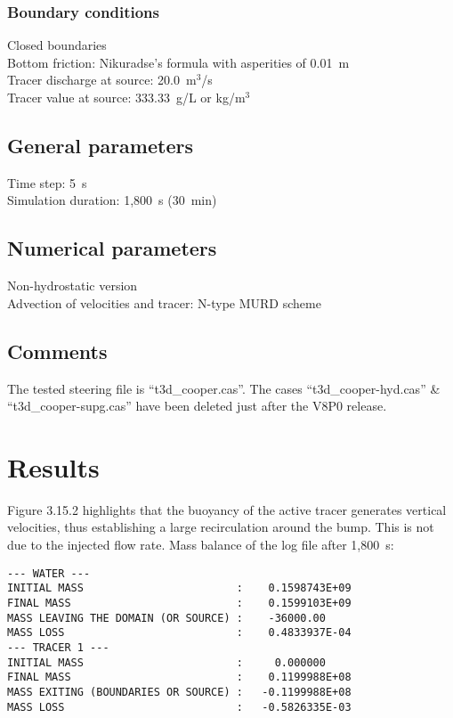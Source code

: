 \subsubsection{Boundary conditions}
%
Closed boundaries\\
Bottom friction: Nikuradse’s formula with asperities of 0.01~m\\
Tracer discharge at source: 20.0~m$^3$/s\\
Tracer value at source: 333.33~g/L or kg/m$^3$
%
\subsection{General parameters}
%
Time step: 5~s\\
Simulation duration: 1,800~s (30~min)
%
%
%
\subsection{Numerical parameters}
%
Non-hydrostatic version\\
Advection of velocities and tracer: N-type MURD scheme
%
\subsection{Comments}
%
The tested steering file is “t3d\_cooper.cas”.
The cases “t3d\_cooper-hyd.cas” \& “t3d\_cooper-supg.cas” have been deleted
just after the V8P0 release.
%
%
%
\section{Results}
%
Figure 3.15.2 highlights that the buoyancy of the active tracer generates vertical velocities,
thus establishing a large recirculation around the bump.
This is not due to the injected flow rate.
Mass balance of the log file after 1,800~s:
\begin{lstlisting}[language=TelFortran]
--- WATER ---
INITIAL MASS                        :    0.1598743E+09
FINAL MASS                          :    0.1599103E+09
MASS LEAVING THE DOMAIN (OR SOURCE) :    -36000.00    
MASS LOSS                           :    0.4833937E-04
--- TRACER 1 ---
INITIAL MASS                        :     0.000000    
FINAL MASS                          :    0.1199988E+08
MASS EXITING (BOUNDARIES OR SOURCE) :   -0.1199988E+08
MASS LOSS                           :   -0.5826335E-03
\end{lstlisting}

